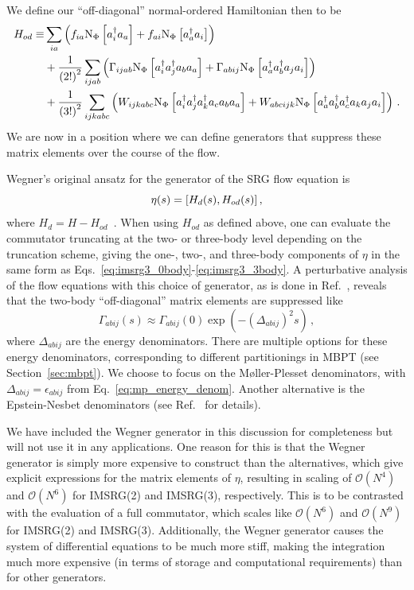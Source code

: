 We define our ``off-diagonal'' normal-ordered Hamiltonian then to be
\begin{equation}
  \begin{split}
    H_{od} \equiv & \sum_{ia}\left(f_{ia} \text{N}_{\Phi}\left[a_{i}^{\dagger}a_{a}\right]
    + f_{ai} \text{N}_{\Phi}\left[a_{a}^{\dagger}a_{i}\right]\right) \\
    & + \frac{1}{{(2!)}^2}\sum_{ijab} \left(
    \Gamma_{ijab} \text{N}_{\Phi}\left[a_{i}^{\dagger}a_{j}^{\dagger}a_{b}a_{a}\right]
    + \Gamma_{abij} \text{N}_{\Phi}\left[a_{a}^{\dagger}a_{b}^{\dagger}a_{j}a_{i}\right]
    \right) \\
    & + \frac{1}{{(3!)}^2}\sum_{ijkabc} \left(
    W_{ijkabc} \text{N}_{\Phi}\left[a_{i}^{\dagger}a_{j}^{\dagger}a_{k}^{\dagger}a_{c}a_{b}a_{a}\right]
    + W_{abcijk} \text{N}_{\Phi}\left[a_{a}^{\dagger}a_{b}^{\dagger}a_{c}^{\dagger}a_{k}a_{j}a_{i}\right]
    \right)\,.
  \end{split}
\end{equation}
We are now in a position where we can define generators that suppress these matrix elements
over the course of the flow.

Wegner's original ansatz for the generator of the SRG flow equation is
\begin{equation}
  \eta(s) = [H_d(s), H_{od}(s)]\,,
\end{equation}
where $H_d = H - H_{od}$~\cite{Wegn94srg}.
When using $H_{od}$ as defined above,
one can evaluate the commutator truncating at the two- or three-body level
depending on the truncation scheme,
giving the one-, two-, and three-body components of $\eta$
in the same form as Eqs.~\eqref{eq:imsrg3_0body}-\eqref{eq:imsrg3_3body}.
A perturbative analysis of the flow equations with this choice of generator,
as is done in Ref.~\cite{Herg16imsrglecnotes},
reveals that the two-body ``off-diagonal'' matrix elements are suppressed like
\begin{equation}
  \Gamma_{abij}(s) \approx \Gamma_{abij}(0) \exp(-{(\Delta_{abij})}^{2} s)\,,
\end{equation}
where $\Delta_{abij}$ are the energy denominators.
There are multiple options for these energy denominators,
corresponding to different partitionings in MBPT (see Section~\ref{sec:mbpt}).
We choose to focus on the M{\o}ller-Plesset denominators,
with $\Delta_{abij} = \epsilon_{abij}$ from Eq.~\eqref{eq:mp_energy_denom}.
Another alternative is the Epstein-Nesbet denominators
(see Ref.~\cite{Shav09mbpt_cc_book} for details).

We have included the Wegner generator in this discussion for completeness
but will not use it in any applications.
One reason for this is that the Wegner generator is simply more expensive to construct
than the alternatives,
which give explicit expressions for the matrix elements of $\eta$,
resulting in scaling of $\mathcal{O}(N^4)$ and $\mathcal{O}(N^6)$ for IMSRG(2) and IMSRG(3),
respectively.
This is to be contrasted with the evaluation of a full commutator,
which scales like $\mathcal{O}(N^6)$ and $\mathcal{O}(N^9)$ for IMSRG(2) and IMSRG(3).
Additionally, the Wegner generator causes the system of differential equations
to be much more stiff,
making the integration much more expensive
(in terms of storage and computational requirements)
than for other generators.

